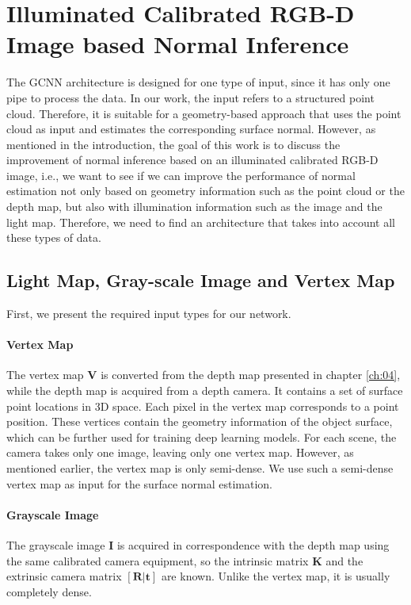 \section{Illuminated Calibrated RGB-D Image based Normal Inference}
\label{sec:trip-net}
The GCNN architecture is designed for one type of input, since it has only one pipe to process the data. In our work, the input refers to a structured point cloud. Therefore, it is suitable for a geometry-based approach that uses the point cloud as input and estimates the corresponding surface normal. However, as mentioned in the introduction, the goal of this work is to discuss the improvement of normal inference based on an illuminated calibrated RGB-D image, i.e., we want to see if we can improve the performance of normal estimation not only based on geometry information such as the point cloud or the depth map, but also with illumination information such as the image and the light map. Therefore, we need to find an architecture that takes into account all these types of data. 


\subsection{Light Map, Gray-scale Image and Vertex Map}
\label{sec:lightmap}
First, we present the required input types for our network.

\paragraph{Vertex Map}
The vertex map $ \textbf{V} $ is converted from the depth map presented in chapter \ref{ch:04}, while the depth map is acquired from a depth camera. It contains a set of surface point locations in 3D space. Each pixel in the vertex map corresponds to a point position. These vertices contain the geometry information of the object surface, which can be further used for training deep learning models. For each scene, the camera takes only one image, leaving only one vertex map. However, as mentioned earlier, the vertex map is only semi-dense. We use such a semi-dense vertex map as input for the surface normal estimation.

\paragraph{Grayscale Image}
The grayscale image $ \textbf{I} $ is acquired in correspondence with the depth map using the same calibrated camera equipment, so the intrinsic matrix $ \textbf{K} $ and the extrinsic camera matrix $ [\textbf{R}|\textbf{t}] $ are known. Unlike the vertex map, it is usually completely dense.

